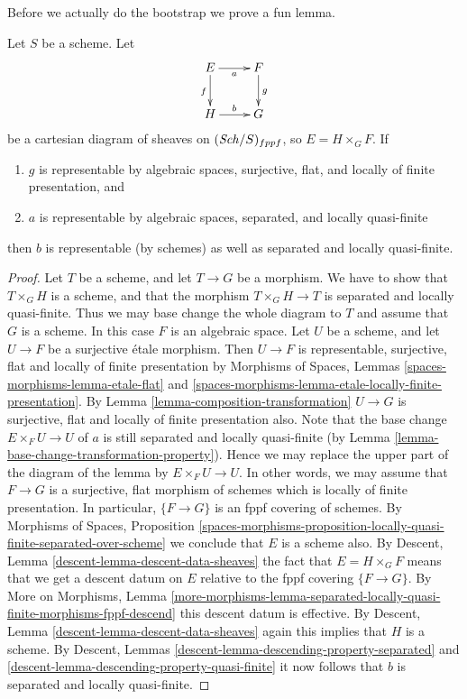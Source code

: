 \medskip\noindent
Before we actually do the bootstrap we prove a fun lemma.

\begin{lemma}
\label{lemma-after-fppf-sep-lqf}
Let $S$ be a scheme.
Let
$$
\xymatrix{
E \ar[r]_a \ar[d]_f & F \ar[d]^g \\
H \ar[r]^b & G
}
$$
be a cartesian diagram of sheaves on $(\mathit{Sch}/S)_{fppf}$, so
$E = H \times_G F$. If
\begin{enumerate}
\item $g$ is representable by algebraic spaces, surjective, flat, and
locally of finite presentation, and
\item $a$ is representable by algebraic spaces, separated, and
locally quasi-finite
\end{enumerate}
then $b$ is representable (by schemes) as well as separated and
locally quasi-finite.
\end{lemma}

\begin{proof}
Let $T$ be a scheme, and let $T \to G$ be a morphism.
We have to show that $T \times_G H$ is a scheme, and that
the morphism $T \times_G H \to T$ is separated and
locally quasi-finite. Thus we may base change the whole diagram to $T$
and assume that $G$ is a scheme. In this case $F$ is an algebraic space.
Let $U$ be a scheme, and let $U \to F$ be a surjective \'etale morphism.
Then $U \to F$ is representable, surjective, flat and
locally of finite presentation by
Morphisms of Spaces,
Lemmas \ref{spaces-morphisms-lemma-etale-flat} and
\ref{spaces-morphisms-lemma-etale-locally-finite-presentation}.
By
Lemma \ref{lemma-composition-transformation}
$U \to G$ is surjective, flat and locally of finite presentation also.
Note that the base change $E \times_F U \to U$ of $a$ is still
separated and locally quasi-finite (by
Lemma \ref{lemma-base-change-transformation-property}). Hence we
may replace the upper part of the diagram of the lemma by
$E \times_F U \to U$. In other words, we may assume that
$F \to G$ is a surjective, flat morphism of schemes
which is locally of finite presentation.
In particular, $\{F \to G\}$ is an fppf covering of schemes.
By
Morphisms of Spaces, Proposition
\ref{spaces-morphisms-proposition-locally-quasi-finite-separated-over-scheme}
we conclude that $E$ is a scheme also.
By
Descent, Lemma \ref{descent-lemma-descent-data-sheaves}
the fact that $E = H \times_G F$ means that we get a descent datum
on $E$ relative to the fppf covering $\{F \to G\}$.
By
More on Morphisms, Lemma
\ref{more-morphisms-lemma-separated-locally-quasi-finite-morphisms-fppf-descend}
this descent datum is effective.
By
Descent, Lemma \ref{descent-lemma-descent-data-sheaves}
again this implies that $H$ is a scheme.
By
Descent, Lemmas \ref{descent-lemma-descending-property-separated} and
\ref{descent-lemma-descending-property-quasi-finite}
it now follows that $b$ is separated and locally quasi-finite.
\end{proof}

